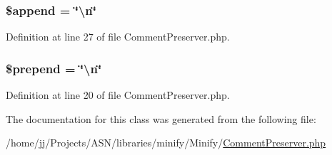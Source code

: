 \subsubsection[{\texorpdfstring{\$append}{$append}}]{\setlength{\rightskip}{0pt plus 5cm}\$append = \char`\"{}\textbackslash{}n\char`\"{}\hspace{0.3cm}{\ttfamily [static]}}\hypertarget{class_minify___comment_preserver_a0363de7e77115bb52718abdab127e971}{}\label{class_minify___comment_preserver_a0363de7e77115bb52718abdab127e971}


Definition at line 27 of file Comment\+Preserver.\+php.

\subsubsection[{\texorpdfstring{\$prepend}{$prepend}}]{\setlength{\rightskip}{0pt plus 5cm}\$prepend = \char`\"{}\textbackslash{}n\char`\"{}\hspace{0.3cm}{\ttfamily [static]}}\hypertarget{class_minify___comment_preserver_a829d62e7dd18027c1fc2c9b3fe321ae2}{}\label{class_minify___comment_preserver_a829d62e7dd18027c1fc2c9b3fe321ae2}


Definition at line 20 of file Comment\+Preserver.\+php.



The documentation for this class was generated from the following file\+:\begin{DoxyCompactItemize}
\item 
/home/jj/\+Projects/\+A\+S\+N/libraries/minify/\+Minify/\hyperlink{_comment_preserver_8php}{Comment\+Preserver.\+php}\end{DoxyCompactItemize}

